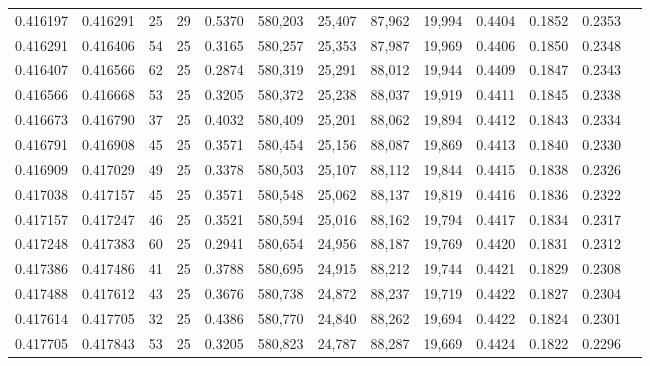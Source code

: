 \begin{tabular}{rrrrrrrrrrrrr}
0.416197 & 0.416291 &    25 &  29 &                                     0.5370 & 580,203 &  25,407 &  87,962 &  19,994 & 0.4404 & 0.1852 & 0.2353 \\
0.416291 & 0.416406 &    54 &  25 &                                     0.3165 & 580,257 &  25,353 &  87,987 &  19,969 & 0.4406 & 0.1850 & 0.2348 \\
0.416407 & 0.416566 &    62 &  25 &                                     0.2874 & 580,319 &  25,291 &  88,012 &  19,944 & 0.4409 & 0.1847 & 0.2343 \\
0.416566 & 0.416668 &    53 &  25 &                                     0.3205 & 580,372 &  25,238 &  88,037 &  19,919 & 0.4411 & 0.1845 & 0.2338 \\
0.416673 & 0.416790 &    37 &  25 &                                     0.4032 & 580,409 &  25,201 &  88,062 &  19,894 & 0.4412 & 0.1843 & 0.2334 \\
0.416791 & 0.416908 &    45 &  25 &                                     0.3571 & 580,454 &  25,156 &  88,087 &  19,869 & 0.4413 & 0.1840 & 0.2330 \\
0.416909 & 0.417029 &    49 &  25 &                                     0.3378 & 580,503 &  25,107 &  88,112 &  19,844 & 0.4415 & 0.1838 & 0.2326 \\
0.417038 & 0.417157 &    45 &  25 &                                     0.3571 & 580,548 &  25,062 &  88,137 &  19,819 & 0.4416 & 0.1836 & 0.2322 \\
0.417157 & 0.417247 &    46 &  25 &                                     0.3521 & 580,594 &  25,016 &  88,162 &  19,794 & 0.4417 & 0.1834 & 0.2317 \\
0.417248 & 0.417383 &    60 &  25 &                                     0.2941 & 580,654 &  24,956 &  88,187 &  19,769 & 0.4420 & 0.1831 & 0.2312 \\
0.417386 & 0.417486 &    41 &  25 &                                     0.3788 & 580,695 &  24,915 &  88,212 &  19,744 & 0.4421 & 0.1829 & 0.2308 \\
0.417488 & 0.417612 &    43 &  25 &                                     0.3676 & 580,738 &  24,872 &  88,237 &  19,719 & 0.4422 & 0.1827 & 0.2304 \\
0.417614 & 0.417705 &    32 &  25 &                                     0.4386 & 580,770 &  24,840 &  88,262 &  19,694 & 0.4422 & 0.1824 & 0.2301 \\
0.417705 & 0.417843 &    53 &  25 &                                     0.3205 & 580,823 &  24,787 &  88,287 &  19,669 & 0.4424 & 0.1822 & 0.2296 \\

\end{tabular}
